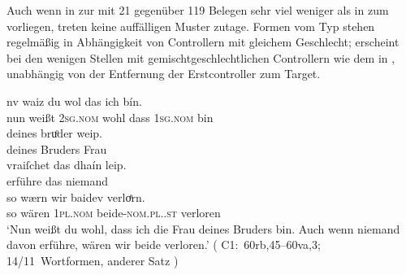 Auch wenn in  zur \KC{} mit 21 gegenüber 119 Belegen
sehr viel weniger als in  zum \CAO{} vorliegen,
treten keine auffälligen Muster zutage. Formen vom Typ  stehen
regelmäßig in Abhängigkeit von Controllern mit gleichem Geschlecht;
 erscheint bei den wenigen Stellen mit gemischtgeschlechtlichen
Controllern wie dem in , unabhängig von der Entfernung der
Erstcontroller zum Target.

\begin{exe}
\ex \label{ex:combgenddist1}

		\gll nv waiz du wol das ich bín. \\
		     nun weißt \textsc{2sg\subM.nom} wohl dass \textsc{1sg\subF.nom} bin \\
	\sn \gll deines bruͦder weip. \\
	         deines Bruders Frau \\
	\sn	\gll vraiſchet das {dhaín leip.} \\
		     erführe das niemand \\
	\sn \gll so wærn wir baidev verloͤrn. \\
		     so wären \textsc{1pl\subMF.nom} beide-\textsc{nom.pl.\NeutMF.st}
		     verloren \\
		\trans `Nun weißt du wohl, dass ich die Frau deines Bruders bin.
			Auch wenn niemand davon erführe, wären wir beide verloren.'
			(%
				C1:~60rb,45--60va,3;
				14/11~Wortformen, anderer Satz%
			)

\end{exe}

